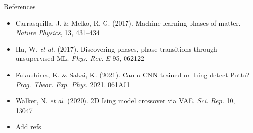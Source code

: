 \documentclass{beamer}
\begin{document}
\begin{frame}{References}
 \begin{itemize}
   \item Carrasquilla, J. \& Melko, R. G. (2017). Machine learning phases of matter. \emph{Nature Physics}, 13, 431–434 
   \item Hu, W. \textit{et al.} (2017). Discovering phases, phase transitions through unsupervised ML. \emph{Phys. Rev. E} 95, 062122 
   \item Fukushima, K. \& Sakai, K. (2021). Can a CNN trained on Ising detect Potts? \emph{Prog. Theor. Exp. Phys.} 2021, 061A01 
   \item Walker, N. \textit{et al.} (2020). 2D Ising model crossover via VAE. \emph{Sci. Rep.} 10, 13047
 \item Add refs
 \end{itemize}
\end{frame}
\end{document}
